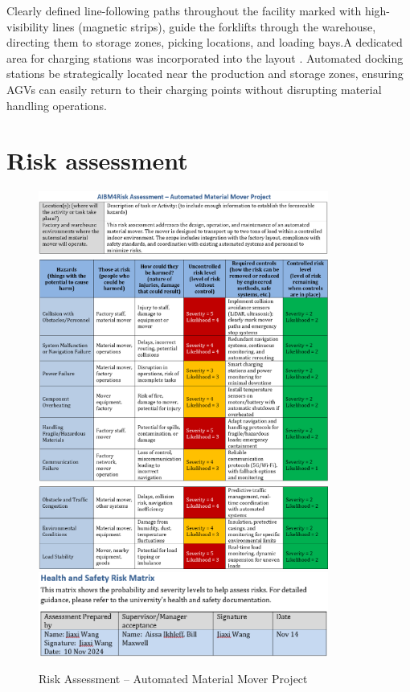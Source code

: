 \documentclass[12pt]{article}
\begin{document}
Clearly defined line-following paths throughout the facility marked with high-visibility lines (magnetic strips), guide the forklifts through the warehouse, directing them to storage zones, picking locations, and loading bays.A dedicated area for charging stations was incorporated into the layout . Automated docking stations be strategically located near the production and storage zones, ensuring AGVs can easily return to their charging points without disrupting material handling operations. 

 
 \section{Risk assessment }
 
\begin{figure}[h!]
    \centering
    \includegraphics[width=0.85\textwidth]{Risk1.png}
    \includegraphics[width=0.85\textwidth]{Risk2.png}
    \includegraphics[width=0.85\textwidth]{Risk3.png}
    \includegraphics[width=0.85\textwidth]{Risk4.png}
    \caption{Risk Assessment – Automated Material Mover Project}
    \label{fig:risk_assessment}
\end{figure}
\FloatBarrier
\end{document}
